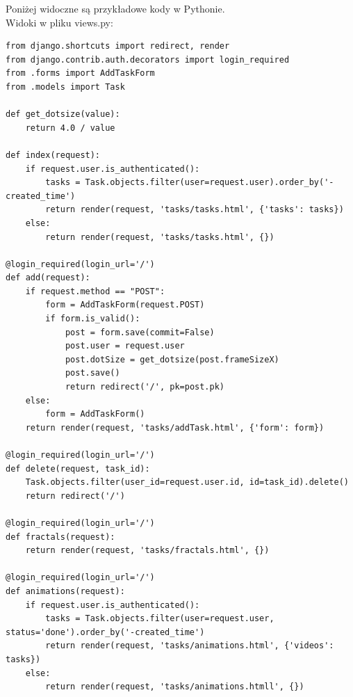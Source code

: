\documentclass[a4paper]{article}
\begin{document}
Poniżej widoczne są przykładowe kody w Pythonie.\\
Widoki w pliku views.py:
\begin{lstlisting}
from django.shortcuts import redirect, render
from django.contrib.auth.decorators import login_required
from .forms import AddTaskForm
from .models import Task

def get_dotsize(value):
    return 4.0 / value

def index(request):
    if request.user.is_authenticated():
        tasks = Task.objects.filter(user=request.user).order_by('-created_time')
        return render(request, 'tasks/tasks.html', {'tasks': tasks})
    else:
        return render(request, 'tasks/tasks.html', {})

@login_required(login_url='/')
def add(request):
    if request.method == "POST":
        form = AddTaskForm(request.POST)
        if form.is_valid():
            post = form.save(commit=False)
            post.user = request.user
            post.dotSize = get_dotsize(post.frameSizeX)
            post.save()
            return redirect('/', pk=post.pk)
    else:
        form = AddTaskForm()
    return render(request, 'tasks/addTask.html', {'form': form})

@login_required(login_url='/')
def delete(request, task_id):
    Task.objects.filter(user_id=request.user.id, id=task_id).delete()
    return redirect('/')

@login_required(login_url='/')
def fractals(request):
    return render(request, 'tasks/fractals.html', {})

@login_required(login_url='/')
def animations(request):
    if request.user.is_authenticated():
        tasks = Task.objects.filter(user=request.user, status='done').order_by('-created_time')
        return render(request, 'tasks/animations.html', {'videos': tasks})
    else:
        return render(request, 'tasks/animations.htmll', {})
\end{lstlisting}
\end{document}
